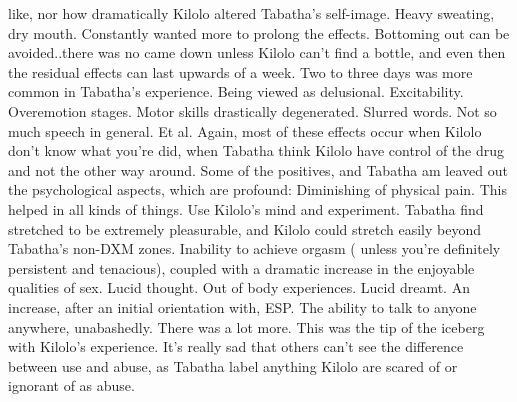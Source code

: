 \documentclass[12pt]{book}
\begin{document}
like, nor how dramatically Kilolo altered Tabatha's self-image. Heavy sweating, dry mouth. Constantly wanted more to prolong the effects. Bottoming out can be avoided..there was no came down unless Kilolo can't find a bottle, and even then the residual effects can last upwards of a week. Two to three days was more common in Tabatha's experience. Being viewed as delusional. Excitability. Overemotion stages. Motor skills drastically degenerated. Slurred words. Not so much speech in general. Et al. Again, most of these effects occur when Kilolo don't know what you're did, when Tabatha think Kilolo have control of the drug and not the other way around. Some of the positives, and Tabatha am leaved out the psychological aspects, which are profound: Diminishing of physical pain. This helped in all kinds of things. Use Kilolo's mind and experiment. Tabatha find stretched to be extremely pleasurable, and Kilolo could stretch easily beyond Tabatha's non-DXM zones. Inability to achieve orgasm ( unless you're definitely persistent and tenacious), coupled with a dramatic increase in the enjoyable qualities of sex. Lucid thought. Out of body experiences. Lucid dreamt. An increase, after an initial orientation with, ESP. The ability to talk to anyone anywhere, unabashedly. There was a lot more. This was the tip of the iceberg with Kilolo's experience. It's really sad that others can't see the difference between use and abuse, as Tabatha label anything Kilolo are scared of or ignorant of as abuse.
\end{document}
